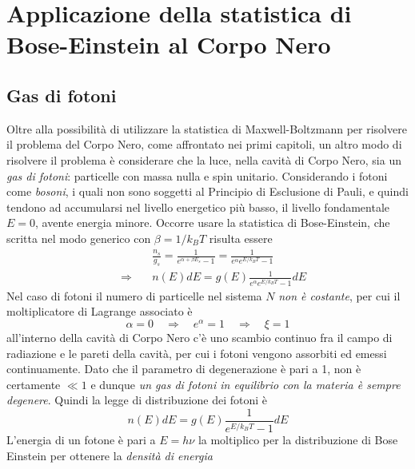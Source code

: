 

\section{Applicazione della statistica di Bose-Einstein al Corpo Nero}


\subsection{Gas di fotoni}
Oltre alla possibilità di utilizzare la statistica di Maxwell-Boltzmann per risolvere il problema del Corpo Nero, come affrontato nei primi capitoli, un altro modo di risolvere il problema è considerare che la luce, nella cavità di Corpo Nero, sia un \textit{gas di fotoni}: particelle con massa nulla e spin unitario.
Considerando i fotoni come \textit{bosoni}, i quali non sono soggetti al Principio di Esclusione di Pauli, e quindi tendono ad accumularsi nel livello energetico più basso, il livello fondamentale $E=0$, avente energia minore.
Occorre usare la statistica di Bose-Einstein, che scritta nel modo generico con $\beta = 1/ k_B T$ risulta essere
\begin{equation}
\begin{split}
& \frac{ n_s}{g_s } = \frac{ 1}{e^{ \alpha + \beta E_s } - 1 } = \frac{ 1}{e^{ \alpha} e^{ E / k_B T } - 1 } \\
\quad\Rightarrow\quad & n(E)dE = g(E) \frac{ 1}{e^{ \alpha} e^{ E / k_B T } - 1 } dE
\end{split}
\end{equation}
Nel caso di fotoni il numero di particelle nel sistema $N$ \textit{non è costante}, per cui il moltiplicatore di Lagrange associato è
\begin{equation}
\alpha = 0 \quad\Rightarrow\quad e^{\alpha} = 1 \quad\Rightarrow\quad  \xi = 1
\end{equation}
all'interno della cavità di Corpo Nero c'è uno scambio continuo fra il campo di radiazione e le pareti della cavità, per cui i fotoni vengono assorbiti ed emessi continuamente.
Dato che il parametro di degenerazione è pari a 1, non è certamente $\ll 1$ e dunque \emph{un gas di fotoni in equilibrio con la materia è sempre degenere}.
Quindi la legge di distribuzione dei fotoni è
\begin{equation}
n(E)dE = g(E) \frac{1}{e^{ E / k_B T } - 1 } dE
\end{equation}
L'energia di un fotone è pari a $E = h \nu$ la moltiplico per la distribuzione di Bose Einstein per ottenere la \textit{densità di energia}
